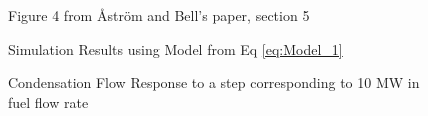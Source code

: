         \begin{figure}[ht]
            \begin{center}
                
                Figure 4 from \r{A}str\"{o}m and Bell's paper, section 5 \cite{Astrom}
                
                
                Simulation Results using Model from Eq \eqref{eq:Model_1}
                
                \caption{Condensation Flow Response to a step corresponding to 10 MW in fuel flow rate}
                \label{fig:Fig4D}
            \end{center}
        \end{figure}            
        
